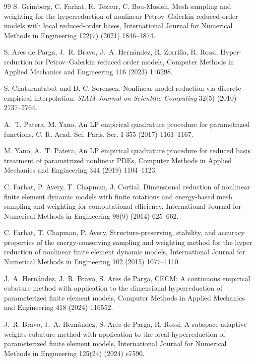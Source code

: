 \begin{thebibliography}{99}
S. Grimberg, C. Farhat, R. Tezaur, C. Bou-Mosleh, Mesh sampling and
weighting for the hyperreduction of nonlinear Petrov--Galerkin
reduced-order models with local reduced-order bases, International
Journal for Numerical Methods in Engineering 122(7) (2021) 1846--1874.

S. Ares de Parga, J.~R. Bravo, J.~A. Hern\'andez, R. Zorrilla,
R. Rossi, Hyper-reduction for Petrov--Galerkin reduced order models,
Computer Methods in Applied Mechanics and Engineering
416 (2023) 116298.

S. Chaturantabut and D. C. Sorensen.
Nonlinear model reduction via discrete empirical interpolation.
\emph{SIAM Journal on Scientific Computing} 32(5) (2010) 2737--2764.

A.~T. Patera, M. Yano,
An LP empirical quadrature procedure for parametrized functions,
C. R. Acad. Sci. Paris, Ser. I 355 (2017) 1161--1167.

M. Yano, A.~T. Patera,
An LP empirical quadrature procedure for reduced basis treatment of parametrized nonlinear PDEs,
Computer Methods in Applied Mechanics and Engineering 344 (2019) 1104--1123.

C. Farhat, P. Avery, T. Chapman, J. Cortial, Dimensional reduction
of nonlinear finite element dynamic models with finite rotations and
energy-based mesh sampling and weighting for computational efficiency,
International Journal for Numerical Methods in Engineering
98(9) (2014) 625--662.

C. Farhat, T. Chapman, P. Avery, Structure-preserving, stability, and accuracy properties of the energy-conserving sampling and weighting method for the hyper reduction of nonlinear finite element dynamic models, International Journal for Numerical Methods in Engineering 102 (2015) 1077--1110. 

J.~A. Hern\'andez, J.~R. Bravo, S. Ares de Parga, CECM: A
continuous empirical cubature method with application to the
dimensional hyperreduction of parameterized finite element models,
Computer Methods in Applied Mechanics and Engineering
418 (2024) 116552.

J.~R. Bravo, J.~A. Hern\'andez, S. Ares de Parga, R. Rossi, A
subspace-adaptive weights cubature method with application to the
local hyperreduction of parameterized finite element models,
International Journal for Numerical Methods in Engineering
125(24) (2024) e7590.


\end{thebibliography}
